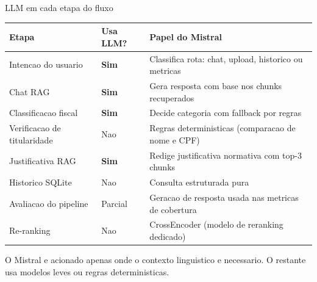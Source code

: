 \documentclass[aspectratio=169,12pt]{beamer}
\renewcommand{\arraystretch}{1.3}
\begin{document}
\begin{frame}{LLM em cada etapa do fluxo}
\begin{center}
\renewcommand{\arraystretch}{1.25}
\begin{tabular}{@{}L{3.5cm}L{2.4cm}L{6.2cm}@{}}
  \toprule
  \textbf{Etapa} & \textbf{Usa LLM?} & \textbf{Papel do Mistral} \\
  \midrule
  Intencao do usuario & \textcolor{declaraTeal}{\textbf{Sim}} & Classifica rota: chat, upload, historico ou metricas \\
  Chat RAG & \textcolor{declaraTeal}{\textbf{Sim}} & Gera resposta com base nos chunks recuperados \\
  Classificacao fiscal & \textcolor{declaraTeal}{\textbf{Sim}} & Decide categoria com fallback por regras \\
  Verificacao de titularidade & \textcolor{declaraGray}{Nao} & Regras deterministicas (comparacao de nome e CPF) \\
  Justificativa RAG & \textcolor{declaraTeal}{\textbf{Sim}} & Redige justificativa normativa com top-3 chunks \\
  Historico SQLite & \textcolor{declaraGray}{Nao} & Consulta estruturada pura \\
  Avaliacao do pipeline & \textcolor{declaraGold}{Parcial} & Geracao de resposta usada nas metricas de cobertura \\
  Re-ranking & \textcolor{declaraGray}{Nao} & CrossEncoder (modelo de reranking dedicado) \\
  \bottomrule
\end{tabular}
\end{center}
\vspace{0.1cm}
\begin{center}
  \footnotesize\color{declaraGray}
  O Mistral e acionado apenas onde o contexto linguistico e necessario.
  O restante usa modelos leves ou regras deterministicas.
\end{center}
\end{frame}
\end{document}
